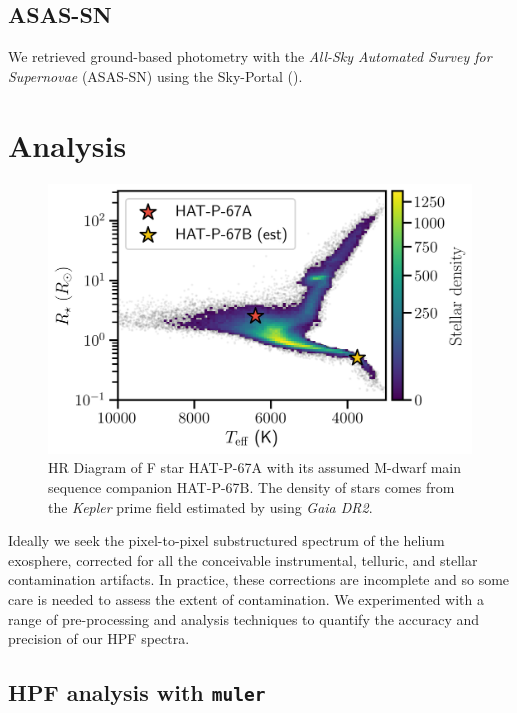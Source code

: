 \documentclass[twocolumn]{aastex631}
\begin{document}
\subsection{ASAS-SN}
We retrieved ground-based photometry with the \emph{All-Sky Automated Survey for Supernovae} (ASAS-SN) using the Sky-Portal ().

\section{Analysis}

\begin{figure}
    \includegraphics[width=\linewidth]{../../figures/Gaia_HAT_P_67_AB.png}
    \caption{HR Diagram of F star HAT-P-67A with its assumed M-dwarf main sequence companion HAT-P-67B.  The density of stars comes from the \emph{Kepler} prime field estimated by \citet{2020AJ....160..108B} using \emph{Gaia DR2}.}
    \label{fig:gaiaHRD}
\end{figure}



Ideally we seek the pixel-to-pixel substructured spectrum of the helium exosphere, corrected for all the conceivable instrumental, telluric, and stellar contamination artifacts.  In practice, these corrections are incomplete and so some care is needed to assess the extent of contamination.  We experimented with a range of pre-processing and analysis techniques to quantify the accuracy and precision of our HPF spectra.

\subsection{HPF analysis with \texttt{muler} }
\end{document}
